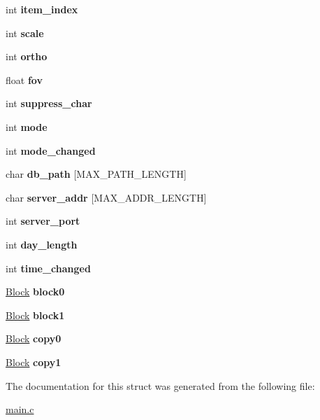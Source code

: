 \begin{DoxyCompactItemize}
int {\bfseries item\+\_\+index}
\item 
\mbox{\label{structModel_a2e5100141918bee00883703185ed79cd}} 
int {\bfseries scale}
\item 
\mbox{\label{structModel_a9ce317de5c55c344b1ce279b0223941f}} 
int {\bfseries ortho}
\item 
\mbox{\label{structModel_ac42baa2c90d6e01bef3680719f59e905}} 
float {\bfseries fov}
\item 
\mbox{\label{structModel_a71a28fca3a64903ea725641e4f63030b}} 
int {\bfseries suppress\+\_\+char}
\item 
\mbox{\label{structModel_add046a4b0c100fba89780214f96c02ba}} 
int {\bfseries mode}
\item 
\mbox{\label{structModel_a6540d35023bbfc1bae76c2932a9efe2b}} 
int {\bfseries mode\+\_\+changed}
\item 
\mbox{\label{structModel_af802d2f02b947ba1772707eb247f8dac}} 
char {\bfseries db\+\_\+path} \mbox{[}M\+A\+X\+\_\+\+P\+A\+T\+H\+\_\+\+L\+E\+N\+G\+TH\mbox{]}
\item 
\mbox{\label{structModel_a945af3964810abe23abf7324a3da1b35}} 
char {\bfseries server\+\_\+addr} \mbox{[}M\+A\+X\+\_\+\+A\+D\+D\+R\+\_\+\+L\+E\+N\+G\+TH\mbox{]}
\item 
\mbox{\label{structModel_ac47fe750112140fe346c32524bf1121b}} 
int {\bfseries server\+\_\+port}
\item 
\mbox{\label{structModel_afd79a77cf19803921e2c10984ec9af52}} 
int {\bfseries day\+\_\+length}
\item 
\mbox{\label{structModel_aa4050c23342bfe2f344466b2e99dd3cb}} 
int {\bfseries time\+\_\+changed}
\item 
\mbox{\label{structModel_afddf699a972eb1144e4e2b6165e6c825}} 
\hyperlink{structBlock}{Block} {\bfseries block0}
\item 
\mbox{\label{structModel_a375b22a0a3043bc685947b33d83bcc17}} 
\hyperlink{structBlock}{Block} {\bfseries block1}
\item 
\mbox{\label{structModel_a3ddb16326999cefcf195fdd796d411a4}} 
\hyperlink{structBlock}{Block} {\bfseries copy0}
\item 
\mbox{\label{structModel_a80358faa79d27e0e905f6542044458c5}} 
\hyperlink{structBlock}{Block} {\bfseries copy1}
\end{DoxyCompactItemize}


The documentation for this struct was generated from the following file\+:\begin{DoxyCompactItemize}
\item 
\hyperlink{main_8c}{main.\+c}\end{DoxyCompactItemize}
